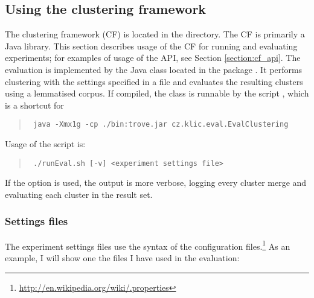 \subsection{Using the clustering framework}
The clustering framework (CF) is located in the  directory. The CF is primarily a Java library. This section describes usage of the CF for running and evaluating experiments; for examples of usage of the API, see Section \ref{section:cf_api}. The evaluation is implemented by the  Java class located in the package . It performs clustering with the settings specified in a file and evaluates the resulting clusters using a lemmatised corpus. If compiled, the class is runnable by the script , which is a shortcut for 
\begin{quote}\tt
java -Xmx1g -cp ./bin:trove.jar cz.klic.eval.EvalClustering 
\end{quote}
Usage of the script is:
\begin{quote}\tt
./runEval.sh [-v] <experiment settings file>
\end{quote}
If the  option is used, the output is more verbose, logging every cluster merge and evaluating each cluster in the result set.

\subsubsection{Settings files}

The experiment settings files use the syntax of the  configuration files.\footnote{\url{http://en.wikipedia.org/wiki/.properties}} As an example, I will show one the files I have used in the evaluation:


